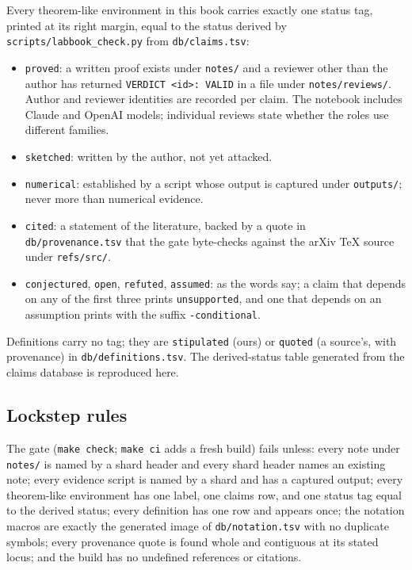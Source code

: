 Every theorem-like environment in this book carries exactly one status tag,
printed at its right margin, equal to the status derived by
\texttt{scripts/labbook\_check.py} from \texttt{db/claims.tsv}:
\begin{itemize}
  \item \texttt{proved}: a written proof exists under \texttt{notes/} and a
  reviewer other than the author has returned \texttt{VERDICT <id>: VALID} in a
  file under \texttt{notes/reviews/}. Author and reviewer identities are
  recorded per claim. The notebook includes Claude and OpenAI models;
  individual reviews state whether the roles use different families.
  \item \texttt{sketched}: written by the author, not yet attacked.
  \item \texttt{numerical}: established by a script whose output is captured
  under \texttt{outputs/}; never more than numerical evidence.
  \item \texttt{cited}: a statement of the literature, backed by a quote in
  \texttt{db/provenance.tsv} that the gate byte-checks against the arXiv TeX
  source under \texttt{refs/src/}.
  \item \texttt{conjectured}, \texttt{open}, \texttt{refuted}, \texttt{assumed}:
  as the words say; a claim that depends on any of the first three prints
  \texttt{unsupported}, and one that depends on an assumption prints with the
  suffix \texttt{-conditional}.
\end{itemize}
Definitions carry no tag; they are \texttt{stipulated} (ours) or
\texttt{quoted} (a source's, with provenance) in \texttt{db/definitions.tsv}.
The derived-status table generated from the claims database is reproduced
here.



\subsection{Lockstep rules}

The gate (\texttt{make check}; \texttt{make ci} adds a fresh build) fails
unless: every note under \texttt{notes/} is named by a shard header and every
shard header names an existing note; every evidence script is named by a
shard and has a captured output; every theorem-like environment has one
label, one claims row, and one status tag equal to the derived status; every
definition has one row and appears once; the notation macros are exactly the
generated image of \texttt{db/notation.tsv} with no duplicate symbols; every
provenance quote is found whole and contiguous at its stated locus; and the
build has no undefined references or citations.
